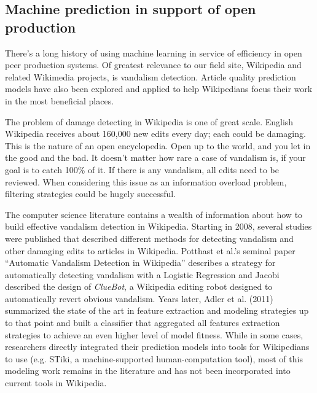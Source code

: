 \subsection{Machine prediction in support of open production}
There's a long history of using machine learning in service of efficiency in open peer production systems.  Of greatest relevance to our field site, Wikipedia and related Wikimedia projects, is vandalism detection.  Article quality prediction models have also been explored and applied to help Wikipedians focus their work in the most beneficial places.

 The problem of damage detecting in Wikipedia is one of great scale.  English Wikipedia receives about 160,000 new edits every day; each could be damaging.  This is the nature of an open encyclopedia. Open up to the world, and you let in the good and the bad.  It doesn't matter how rare a case of vandalism is, if your goal is to catch 100\% of it.  If there is any vandalism, all edits need to be reviewed.  When considering this issue as an information overload problem, filtering strategies could be hugely successful.

The computer science literature contains a wealth of information about how to build effective vandalism detection in Wikipedia.  Starting in 2008, several studies were published that described different methods for detecting vandalism and other damaging edits to articles in Wikipedia.  Potthast et al.'s seminal paper ``Automatic Vandalism Detection in Wikipedia''\cite{potthast2008automatic} describes a strategy for automatically detecting vandalism with a Logistic Regression and Jacobi described the design of \emph{ClueBot}\cite{carter2008cluebot}, a Wikipedia editing robot designed to automatically revert obvious vandalism.  Years later, Adler et al. (2011) summarized the state of the art in feature extraction and modeling strategies up to that point and built a classifier that aggregated all features extraction strategies to achieve an even higher level of model fitness\cite{adler2011wikipedia}.  While in some cases, researchers directly integrated their prediction models into tools for Wikipedians to use (e.g. STiki\cite{west2010stiki}, a machine-supported human-computation tool), most of this modeling work remains in the literature and has not been incorporated into current tools in Wikipedia.

